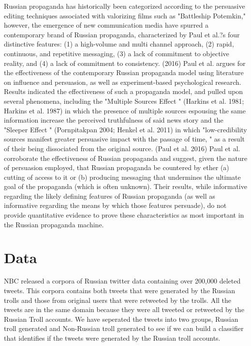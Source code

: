 \documentclass[11pt,a4paper]{article}
\begin{document}
Russian propaganda has historically been categorized according to the persuasive editing techniques associated with valorizing films such as  "Battleship Potemkin," however, the emergence of new communication media have spurred a contemporary brand of Russian propaganda, characterized by Paul et al.?s four distinctive features: (1) a high-volume and multi channel approach, (2) rapid, continuous, and repetitive messaging, (3) a lack of commitment to objective reality, and (4) a lack of commitment to consistency. (2016) Paul et al. argues for the effectiveness of the contemporary Russian propaganda model using literature on influence and persuasion, as well as experiment-based psychological research. Results indicated the effectiveness of such a propaganda model, and pulled upon several phenomena, including the   "Multiple Sources Effect  " (Harkins et al. 1981; Harkins et al. 1987) in which the presence of multiple sources espousing the same information increase the perceived truthfulness of said news story and the   "Sleeper Effect  " (Pornpitakpan 2004; Henkel et al. 2011) in which  "low-credibility sources manifest greater persuasive impact with the passage of time, " as a result of their being dissociated from the original source. (Paul et al. 2016) Paul et al. corroborate the effectiveness of Russian propaganda and suggest, given the nature of persuasion employed, that Russian propaganda be countered by ether (a) cutting of access to it or (b) producing messaging that undermines the ultimate goal of the propaganda (which is often unknown). Their results, while informative regarding the likely defining features of Russian propaganda (as well as informative regarding the means by which those features persuade), do not provide quantitative evidence to prove these characteristics as most important in the Russian propaganda machine. 

\section{Data}

NBC released a corpora of Russian twitter data containing over 200,000 deleted tweets. This corpora contains both tweets that were generated by the Russian trolls and those from original users that were retweeted by the trolls. All the tweets are in the same domain because they were all tweeted or retweeted by the Russian Troll accounts. We have seperated the tweets into two groups, Russian troll generated and Non-Russian troll generated to see if we can build a classifier that identifies if the tweets were generated by the Russian troll accounts. 
\end{document}
